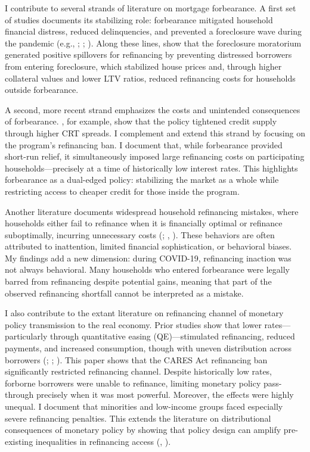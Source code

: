 \documentclass[11pt]{article}
\begin{document}
\noindent I contribute to several strands of literature on mortgage forbearance. A first set of studies documents its stabilizing role: forbearance mitigated household financial distress, reduced delinquencies, and prevented a foreclosure wave during the pandemic (e.g., \citet{an2022inequality}; \citet{contat2024individual}; \citet{cherry2021government}). Along these lines, \citet{capponi2022effect} show that the foreclosure moratorium generated positive spillovers for refinancing by preventing distressed borrowers from entering foreclosure, which stabilized house prices and, through higher collateral values and lower LTV ratios, reduced refinancing costs for households outside forbearance.

A second, more recent strand emphasizes the costs and unintended consequences of forbearance. \citet{gete2025forbearance}, for example, show that the policy tightened credit supply through higher CRT spreads. I complement and extend this strand by focusing on the program’s refinancing ban. I document that, while forbearance provided short-run relief, it simultaneously imposed large refinancing costs on participating households—precisely at a time of historically low interest rates. This highlights forbearance as a dual-edged policy: stabilizing the market as a whole while restricting access to cheaper credit for those inside the program.

Another literature documents widespread household refinancing mistakes, where households either fail to refinance when it is financially optimal or refinance suboptimally, incurring unnecessary costs (\citet{agarwal2013optimal}; \citet{keys2016failure}, \citet{agarwal2017systematic}). These behaviors are often attributed to inattention, limited financial sophistication, or behavioral biases. My findings add a new dimension: during COVID-19, refinancing inaction was not always behavioral. Many households who entered forbearance were legally barred from refinancing despite potential gains, meaning that part of the observed refinancing shortfall cannot be interpreted as a mistake. 


I also contribute to the extant literature on refinancing channel of monetary policy transmission to the real economy. Prior studies show that lower rates—particularly through quantitative easing (QE)—stimulated refinancing, reduced payments, and increased consumption, though with uneven distribution across borrowers (\citealp{keys2016failure}; \citealp{di2020quantitative}; \citealp{beraja2019regional}). This paper shows that the CARES Act refinancing ban significantly restricted refinancing channel. Despite historically low rates, forborne borrowers were unable to refinance, limiting monetary policy pass-through precisely when it was most powerful. Moreover, the effects were highly unequal. I document that minorities and low-income groups faced especially severe refinancing penalties. This extends the literature on distributional consequences of monetary policy by showing that policy design can amplify pre-existing inequalities in refinancing access (\citet{gerardi2021racial,gerardi2023mortgage}, \citet{agarwal2024refinancing}).
 
\end{document}
